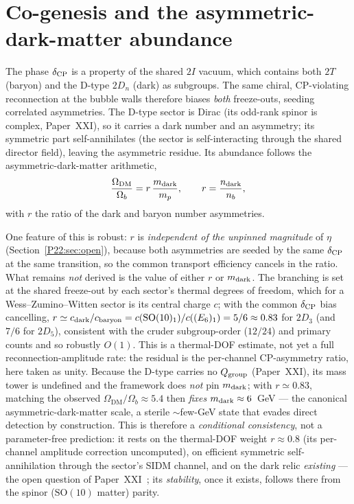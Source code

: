 \documentclass[11pt,a4paper]{article}
\theoremstyle{definition}\newtheorem{definition}[theorem]{Definition}
\newcommand{\twoT}{2T}
\newcommand{\twoD}{2D}
\newcommand{\twoI}{2I}
\newcommand{\Odm}{\Omega_{\mathrm{DM}}}
\newcommand{\Ob}{\Omega_{b}}
\begin{document}
\section{Co-genesis and the asymmetric-dark-matter abundance}
\label{P22:sec:abund}
The phase $\delta_{\rm CP}$ is a property of the shared $\twoI$ vacuum, which contains both
$\twoT$ (baryon) and the D-type $\twoD_n$ (dark) as subgroups. The same chiral, CP-violating
reconnection at the bubble walls therefore biases \emph{both} freeze-outs, seeding correlated
asymmetries. The D-type sector is Dirac (its odd-rank spinor is complex, Paper~XXI), so it
carries a dark number and an asymmetry; its symmetric part self-annihilates (the sector is
self-interacting through the shared director field), leaving the asymmetric residue. Its
abundance follows the asymmetric-dark-matter arithmetic,
\begin{equation}
  \frac{\Odm}{\Ob}=r\,\frac{m_{\rm dark}}{m_p},\qquad r=\frac{n_{\rm dark}}{n_b},
  \label{P22:eq:adm}
\end{equation}
with $r$ the ratio of the dark and baryon number asymmetries.

One feature of this is robust: $r$ is \emph{independent of the unpinned magnitude} of $\eta$
(Section~\ref{P22:sec:open}), because both asymmetries are seeded by the same $\delta_{\rm CP}$ at the
same transition, so the common transport efficiency cancels in the ratio. What remains \emph{not}
derived is the value of either $r$ or $m_{\rm dark}$. The branching is set at the shared freeze-out
by each sector's thermal degrees of freedom, which for a Wess--Zumino--Witten sector is its central
charge $c$; with the common $\delta_{\rm CP}$ bias cancelling,
$r\simeq c_{\rm dark}/c_{\rm baryon}=c(\mathrm{SO}(10)_1)/c((E_6)_1)=5/6\approx0.83$ for $\twoD_3$
(and $7/6$ for $\twoD_5$), consistent with the cruder subgroup-order ($12/24$) and primary counts
and so robustly $O(1)$. This is a thermal-DOF estimate, not yet a full reconnection-amplitude rate:
the residual is the per-channel CP-asymmetry ratio, here taken as unity. Because the D-type carries
no $Q_{\rm group}$ (Paper~XXI), its mass tower is undefined and the framework does \emph{not} pin
$m_{\rm dark}$; with $r\simeq0.83$, matching the observed $\Odm/\Ob\approx5.4$ then \emph{fixes}
$m_{\rm dark}\approx6$~GeV --- the canonical asymmetric-dark-matter scale, a sterile $\sim$few-GeV
state that evades direct detection by construction. This is therefore a \emph{conditional
consistency}, not a parameter-free prediction: it rests on the thermal-DOF weight $r\approx0.8$
(its per-channel amplitude correction uncomputed), on efficient symmetric self-annihilation through the
sector's SIDM channel, and on the dark relic \emph{existing} --- the open question of
Paper~XXI~\cite{Paper21}; its \emph{stability}, once it exists, follows there from the
spinor ($\mathrm{SO}(10)$ matter) parity.
\end{document}

